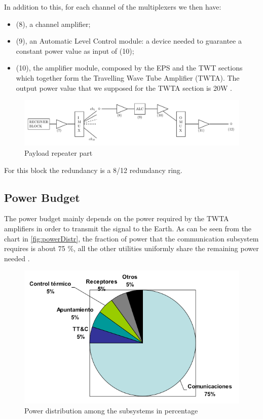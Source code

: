 \documentclass[11pt,a4paper,titlepage]{article}
\begin{document}
In addition to this, for each channel of the multiplexers we then have:
			\begin{itemize}
			\item (8), a channel amplifier;
			\item (9), an Automatic Level Control module: a device needed to guarantee a constant power value as input of 					(10);
			\item (10), the amplifier module, composed by the EPS and the TWT sections which together form the Travelling Wave Tube Amplifier (TWTA). The output power value that we supposed for the TWTA section is 20W \cite{Maral2017}.
			\end{itemize}
			\begin{figure}[h]
				\centering
				\includegraphics[width = \textwidth]{payload_repeater.pdf}
				\caption{Payload repeater part}
				\label{fig:repeater}
			\end{figure}
For this block the redundancy is a 8/12 redundancy ring.

	\subsection{Power Budget}
	The power budget mainly depends on the power required by the TWTA amplifiers in order to transmit the signal to the Earth. As can be seen from the chart in \autoref{fig:powerDistr}, the fraction of power that the communication subsystem requires is about 75 \%, all the other utilities uniformly share the remaining power needed \cite{Miguel17}.
	\begin{figure}[h]
		\centering
		\includegraphics[width = .7\textwidth]{powerDistr.png}
		\caption{Power distribution among the subsystems in percentage}
		\label{fig:powerDistr}
	\end{figure}
\end{document}

